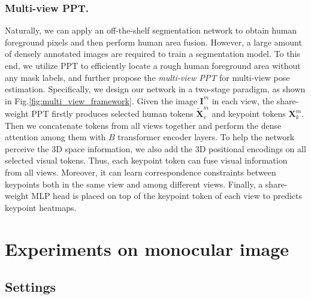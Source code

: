 \documentclass[runningheads]{llncs}
\begin{document}
\subsubsection{Multi-view PPT. }
Naturally, we can apply an off-the-shelf segmentation network \cite{he2017mask} to obtain human foreground pixels and then perform human area fusion. However, a large amount of densely annotated images are required to train a segmentation model. 
To this end, we utilize PPT to efficiently locate a rough human foreground area without any mask labels, and further propose the \textit{multi-view PPT} for multi-view pose estimation. 
Specifically, we design our network in a two-stage paradigm, as shown in Fig.\ref{fig:multi_view_framework}.  
Given the image $\mathbf{I}^m$ in each view, the share-weight PPT firstly produces selected human tokens $\mathbf{ \tilde{X}}^m_v$ and keypoint tokens $\mathbf{X}^m_k$. 
Then we concatenate tokens from all views together and perform the dense attention among them with $B$ transformer encoder layers. 
To help the network perceive the 3D space information, we also add the 3D positional encodings \cite{ma2021transfusion} on all selected visual tokens. 
Thus, each keypoint token can fuse visual information from all views.  Moreover, it can learn correspondence constraints between keypoints both in the same view and among different views. 
Finally, a share-weight MLP head is placed on top of the keypoint token of each view to predicts keypoint heatmaps. 















\vspace{-0.5em}
\section{Experiments on monocular image}
\vspace{-0.5em}

\subsection{Settings} 
\end{document}
